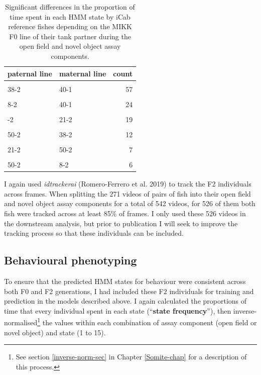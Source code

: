 \documentclass[
]{book}
\begin{document}
\begin{table}

\caption{\label{tab:F2-cross-counts}Significant differences in the proportion of time spent in each HMM state by iCab reference fishes depending on the MIKK F0 line of their tank partner during the open field and novel object assay components.}
\centering
\begin{tabular}[t]{llr}
\toprule
paternal line & maternal line & count\\
\midrule
\cellcolor{gray!6}{21-2} & \cellcolor{gray!6}{40-1} & \cellcolor{gray!6}{60}\\
38-2 & 40-1 & 57\\
\cellcolor{gray!6}{38-2} & \cellcolor{gray!6}{18-2} & \cellcolor{gray!6}{35}\\
8-2 & 40-1 & 24\\
\cellcolor{gray!6}{50-2} & \cellcolor{gray!6}{18-2} & \cellcolor{gray!6}{23}\\
\addlinespace
38-2 & 21-2 & 19\\
\cellcolor{gray!6}{8-2} & \cellcolor{gray!6}{38-2} & \cellcolor{gray!6}{15}\\
50-2 & 38-2 & 12\\
\cellcolor{gray!6}{18-2} & \cellcolor{gray!6}{21-2} & \cellcolor{gray!6}{7}\\
21-2 & 50-2 & 7\\
\addlinespace
\cellcolor{gray!6}{40-1} & \cellcolor{gray!6}{50-2} & \cellcolor{gray!6}{6}\\
50-2 & 8-2 & 6\\
\bottomrule
\end{tabular}
\end{table}

I again used \emph{idtrackerai} (Romero-Ferrero et al. 2019) to track the F2 individuals across frames. When splitting the 271 videos of pairs of fish into their open field and novel object assay components for a total of 542 videos, for 526 of them both fish were tracked across at least 85\% of frames. I only used these 526 videos in the downstream analysis, but prior to publication I will seek to improve the tracking process so that these individuals can be included.

\hypertarget{behavioural-phenotyping}{%
\subsection{Behavioural phenotyping}\label{behavioural-phenotyping}}

To ensure that the predicted HMM states for behaviour were consistent across both F0 and F2 generations, I had included these F2 individuals for training and prediction in the models described above. I again calculated the proportions of time that every individual spent in each state (``\textbf{state frequency}''), then inverse-normalised\footnote{See section \ref{inverse-norm-sec} in Chapter \ref{Somite-chap} for a description of this process.} the values within each combination of assay component (open field or novel object) and state (1 to 15).
\end{document}
